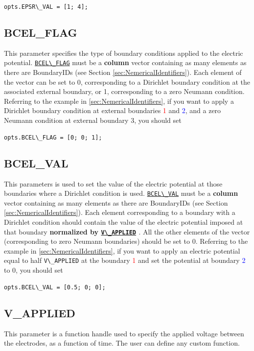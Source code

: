 \documentclass[12pt,a4paper]{article}
\newcommand{\matlabs}[1]{{\lstinline[style=MatlabStyle]!#1!}}
\newcommand{\seclink}[2]{%
	\begingroup
	\hypersetup{linkcolor=orange}%
	\hyperref[sec:#1]{\matlabs{#2}}%
	\endgroup
}
\begin{document}
	\matlabs{opts.EPSR\_VAL = [1; 4];}
	
	\subsection{BCEL\_FLAG}
	\label{sec:bcelflag}
	This parameter specifies the type of boundary conditions applied to the electric potential. \seclink{bcelflag}{BCEL\_FLAG} must be a \textbf{column} vector containing as many elements as there are BoundaryIDs (see Section \ref{sec:NemericalIdentifiers}). Each element of the vector can be set to 0, corresponding to a Dirichlet boundary condition at the associated external boundary, or 1, corresponding to a zero Neumann condition. Referring to the example in \ref{sec:NemericalIdentifiers}, if you want to apply a Dirichlet boundary condition at external boundaries \textcolor{red}{1} and \textcolor{blue}{2}, and a zero Neumann condition at external boundary \textcolor{mygreen}{3}, you should set
	
	\matlabs{opts.BCEL\_FLAG = [0; 0; 1];}
	
	\subsection{BCEL\_VAL}
	\label{sec:bcelval}
	This parameters is used to set the value of the electric potential at those boundaries where a Dirichlet condition is used. \seclink{bcelval}{BCEL\_VAL} must be a \textbf{column} vector containing as many elements as there are BoundaryIDs (see Section \ref{sec:NemericalIdentifiers}). Each element corresponding to a boundary with a Dirichlet condition should contain the value of the electric potential imposed at that boundary \textbf{normalized by \seclink{vapplied}{V\_APPLIED}}. All the other elements of the vector (corresponding to zero Neumann boundaries) should be set to 0. Referring to the example in \ref{sec:NemericalIdentifiers}, if you want to apply an electric potential equal to half \matlabs{V\_APPLIED} at the boundary \textcolor{red}{1} and set the potential at boundary \textcolor{blue}{2} to 0, you should set
	
	\matlabs{opts.BCEL\_VAL = [0.5; 0; 0];}
	
	\subsection{V\_APPLIED}
	\label{sec:vapplied}
	This parameter is a function handle used to specify the applied voltage between the electrodes, as a function of time. The user can define any custom function.
	
\end{document}
